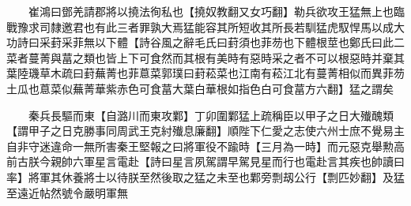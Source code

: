 　　崔鴻曰鄧羌請郡將以撓法徇私也【撓奴教翻又女巧翻】勒兵欲攻王猛無上也臨戰豫求司隸邀君也有此三者罪孰大焉猛能容其所短收其所長若馴猛虎馭悍馬以成大功詩曰采葑采菲無以下體【詩谷風之辭毛氏曰葑須也菲芴也下體根莖也鄭氏曰此二菜者蔓菁與葍之類也皆上下可食然而其根有美時有惡時采之者不可以根惡時并棄其葉陸璣草木疏曰葑蕪菁也菲蒠菜郭璞曰葑菘菜也江南有菘江北有蔓菁相似而異菲芴土瓜也蒠菜似蕪菁華紫赤色可食葍大葉白華根如指色白可食葍方六翻】猛之謂矣

　　秦兵長驅而東【自潞川而東攻鄴】丁卯圍鄴猛上疏稱臣以甲子之日大殱醜類【謂甲子之日克勝事同周武王克紂殱息廉翻】順陛下仁愛之志使六州士庶不覺易主自非守迷違命一無所害秦王堅報之曰將軍役不踰時【三月為一時】而元惡克舉勲高前古朕今親帥六軍星言電赴【詩曰星言夙駕謂早駕見星而行也電赴言其疾也帥讀曰率】將軍其休養將士以待朕至然後取之猛之未至也鄴旁剽刼公行【剽匹妙翻】及猛至遠近帖然號令嚴明軍無